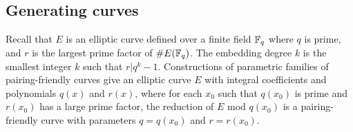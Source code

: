 

\subsection{Generating curves}
\label{subsec:gencurves}

Recall that $E$ is an elliptic curve defined over a finite field $\mathbb{F}_{q}$ where $q$ is prime,
and $r$ is the largest prime factor of $\# E(\mathbb{F}_{q})$.
The embedding degree $k$ is the smallest integer $k$ such that $r | q^k -1$.
Constructions of parametric families of pairing-friendly curves give an elliptic curve $E$ with integral coefficients and polynomials $q(x)$ and $r(x)$,
where for each $x_0$ such that $q(x_0)$ is prime and $r(x_0)$ has a large prime factor, the reduction of $E$ mod $q(x_0)$ is a pairing-friendly curve with parameters $q = q(x_0)$ and $r = r(x_0)$.

